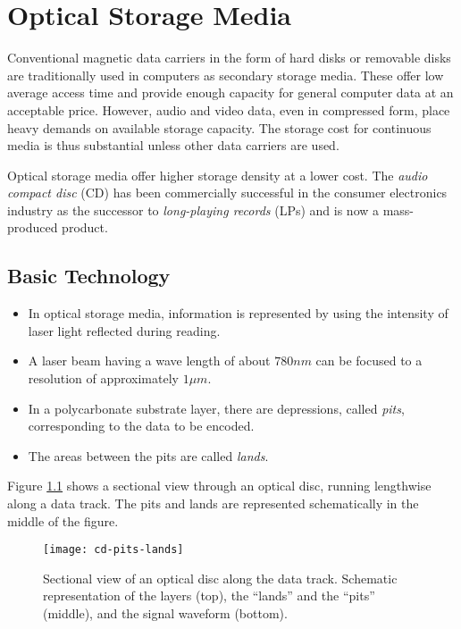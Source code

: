 \chapter{Optical Storage Media}
Conventional magnetic data carriers in the form of hard disks or removable disks are traditionally used in computers as secondary storage media. These offer low average access time and provide enough capacity for general computer data at an acceptable price. However, audio and video data, even in compressed form, place heavy demands on available storage capacity. The storage cost for continuous media is thus substantial unless other data carriers are used.

Optical storage media offer higher storage density at a lower cost. The \textit{audio compact disc} (CD) has been commercially successful in the consumer electronics industry as the successor to \textit{long-playing records} (LPs) and is now a mass-produced product.

\section{Basic Technology}
\begin{itemize}
	\item In optical storage media, information is represented by using the intensity of laser light reflected during reading. 
	\item A laser beam having a wave length of about $ 780nm $ can be focused to a resolution of approximately $ 1 \mu m $. 
	\item In a polycarbonate substrate layer, there are depressions, called \textit{pits}, corresponding to the	data to be encoded. 
	\item The areas between the pits are called \textit{lands}.
\end{itemize}

Figure {\ref{fig:cd-pits-lands}} shows a sectional view through an optical disc, running lengthwise along a data track. The pits and lands are represented schematically in the middle of the figure.
\begin{figure}[ht!]
	\centering
	\texttt{[image: cd-pits-lands]}
	\caption[Sectional view of an optical disc]{Sectional view of an optical disc along the data track. Schematic representation of the layers (top), the ``lands'' and the ``pits'' (middle), and the signal waveform (bottom).}{\label{fig:cd-pits-lands}}
\end{figure}

